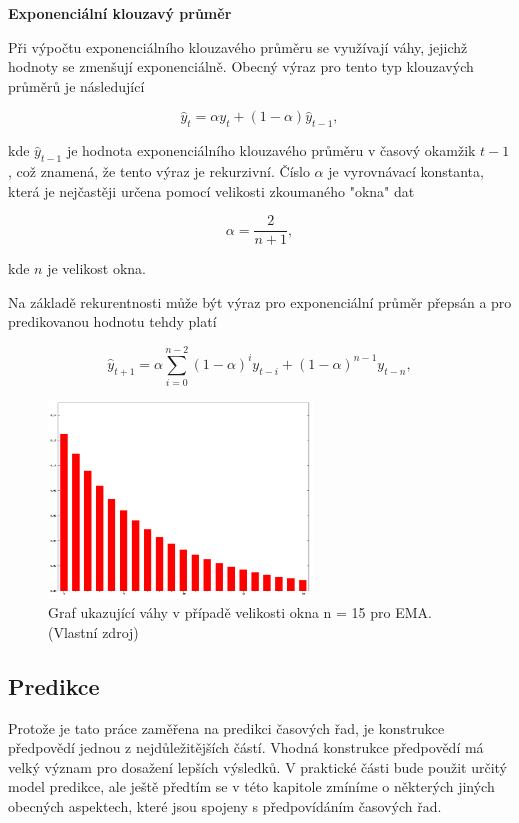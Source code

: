 \documentclass[a4paper,12pt,twoside]{scrreprt}
\begin{document}
\normalsize \textbf{Exponenciální klouzavý průměr}

Při výpočtu exponenciálního klouzavého průměru se využívají váhy, jejichž hodnoty se zmenšují exponenciálně. Obecný výraz pro tento typ klouzavých průměrů je následující 

\begin{equation}
\hat{y}_{t} = \alpha{y}_t + (1-\alpha)\hat{y}_{t-1}, 
\end{equation}  

kde $\hat{y}_{t-1}$ je hodnota exponenciálního klouzavého průměru v časový okamžik $t-1$, což znamená, že tento výraz je rekurzivní. Číslo $\alpha$ je vyrovnávací konstanta, která je nejčastěji určena pomocí velikosti zkoumaného "okna" \space dat

\begin{equation}
\alpha = \frac{2}{n+1}, 
\end{equation}  

kde $n$ je velikost okna.

Na základě rekurentnosti může být výraz pro exponenciální průměr přepsán a pro predikovanou hodnotu tehdy platí 

\begin{equation}
\hat{y}_{t+1} = \alpha\sum_{i=0}^{n-2}(1-\alpha)^iy_{t-i} + (1-\alpha)^{n-1}y_{t-n},
\end{equation}

\begin{figure}[h]
  \centering
  \includegraphics[width=7cm]{pictures/exponentialMAweights.png}
  \caption{Graf ukazující váhy v případě velikosti okna n = 15 pro EMA. \newline(Vlastní zdroj)}
  \label{fig:exponentialWeights}
\end{figure}

\subsection{Predikce}

Protože je tato práce zaměřena na predikci časových řad, je konstrukce předpovědí jednou z nejdůležitějších částí. Vhodná konstrukce předpovědí má velký význam pro dosažení lepších výsledků. V praktické části bude použit určitý model predikce, ale ještě předtím se v této kapitole zmíníme o některých jiných obecných aspektech, které jsou spojeny s předpovídáním časových řad. 
\end{document}
